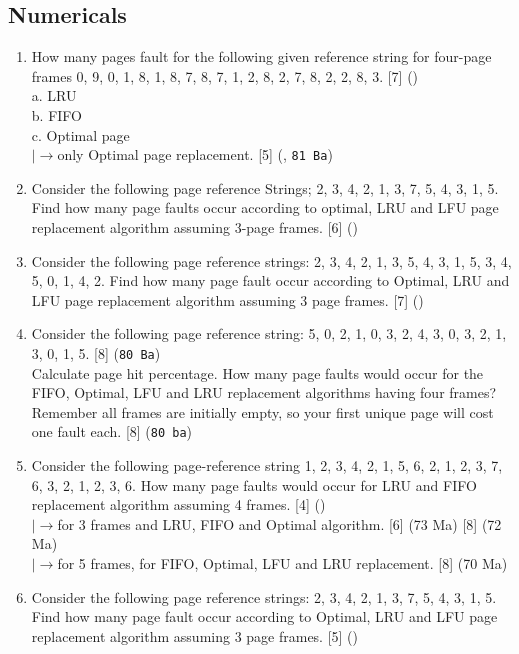 \documentclass[12pt]{article}
\newcommand{\lb}{\\$\left|\rightarrow\right.$}
\begin{document}
	\subsection{Numericals}
		\begin{enumerate}
			\item How many pages fault for the following given reference string for four-page frames 0, 9, 0, 1, 8, 1, 8, 7, 8, 7, 1, 2, 8, 2, 7, 8, 2, 2, 8, 3. \hfill [7] ()\\
			a. LRU\\
			b. FIFO\\
			c. Optimal page
			\lb only Optimal page replacement. \hfill [5] (, \texttt{81 Ba})

			\item Consider the following page reference Strings; 2, 3, 4, 2, 1, 3, 7, 5, 4, 3, 1, 5. Find how many page faults occur according to optimal, LRU and LFU page replacement algorithm assuming 3-page frames. \hfill [6] ()		
			
			\item Consider the following page reference strings: 2, 3, 4, 2, 1, 3, 5, 4, 3, 1, 5, 3, 4, 5, 0, 1, 4, 2. Find how many page fault occur according to Optimal, LRU and LFU page replacement algorithm assuming 3 page frames. \hfill [7] ()

			\item Consider the following page reference string: 5, 0, 2, 1, 0, 3, 2, 4, 3, 0, 3, 2, 1, 3, 0, 1, 5. \hfill [8] (\texttt{80 Ba})\\
			Calculate page hit percentage. How many page faults would occur for the FIFO, Optimal, LFU and LRU replacement algorithms having four frames? Remember all frames are initially empty, so your first unique page will cost one fault each. \hfill [8] (\texttt{80 ba})

			\item Consider the following page-reference string 1, 2, 3, 4, 2, 1, 5, 6, 2, 1, 2, 3, 7, 6, 3, 2, 1, 2, 3, 6. How many page faults would occur for LRU and FIFO replacement algorithm assuming 4 frames. \hfill [4] ()
			\lb for 3 frames and LRU, FIFO and Optimal algorithm. \hfill [6] (73 Ma) [8] (72 Ma)
			\lb for 5 frames, for FIFO, Optimal, LFU and LRU replacement. \hfill [8] (70 Ma)

			\item Consider the following page reference strings: 2, 3, 4, 2, 1, 3, 7, 5, 4, 3, 1, 5. Find how many page fault occur according to Optimal, LRU and LFU page replacement algorithm assuming 3 page frames. \hfill [5] ()


\end{enumerate}
\end{document}
